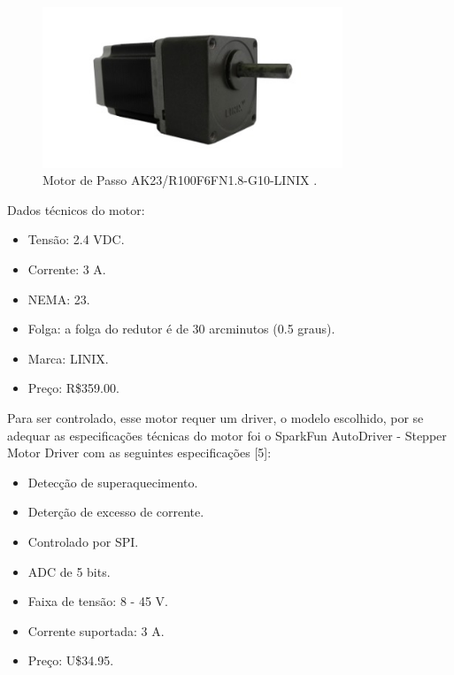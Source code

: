 \begin{figure}[H]
  \centering
  \includegraphics[width=0.8\textwidth]{figuras/M}
  \caption{Motor de Passo AK23/R100F6FN1.8-G10-LINIX .}
  \label{img:motorpasso}
\end{figure}

Dados técnicos do motor:

\begin{itemize}
	\item Tensão: 2.4 VDC.
	\item Corrente: 3 A.
	\item NEMA: 23.
	\item Folga: a folga do redutor é de 30 arcminutos (0.5 graus).
	\item Marca: LINIX.
	\item Preço: R\$359.00.
\end{itemize}

Para ser controlado, esse motor requer um driver, o modelo escolhido, por se adequar as especificações técnicas do motor foi o SparkFun AutoDriver - Stepper Motor Driver com as seguintes especificações [5]:

\begin{itemize}
	\item Detecção de superaquecimento.
	\item Deterção de excesso de corrente.
	\item Controlado por SPI.
	\item ADC de 5 bits.
	\item Faixa de tensão: 8 - 45 V.
	\item Corrente suportada: 3 A.
	\item Preço: U\$34.95.
\end{itemize}
